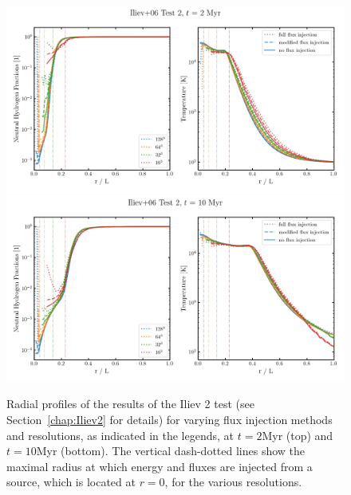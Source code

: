 \begin{figure}
 \centering

\includegraphics[width=\textwidth]
{figures/RHD/injection_models/injection_convergence_test_2Myr.png}
\\
\includegraphics[width=\textwidth]
{figures/RHD/injection_models/injection_convergence_test_10Myr.png}
\caption{
Radial profiles of the results of the Iliev 2 test (see Section~\ref{chap:Iliev2} for details) for
varying flux injection methods and resolutions, as indicated in the legends, at $t = 2$Myr (top)
and $t = 10$Myr (bottom). The vertical dash-dotted lines show the maximal radius at which energy
and fluxes are injected from a source, which is located at $r = 0$, for the various resolutions.
 }
 \label{fig:injection_convergence}
\end{figure}


